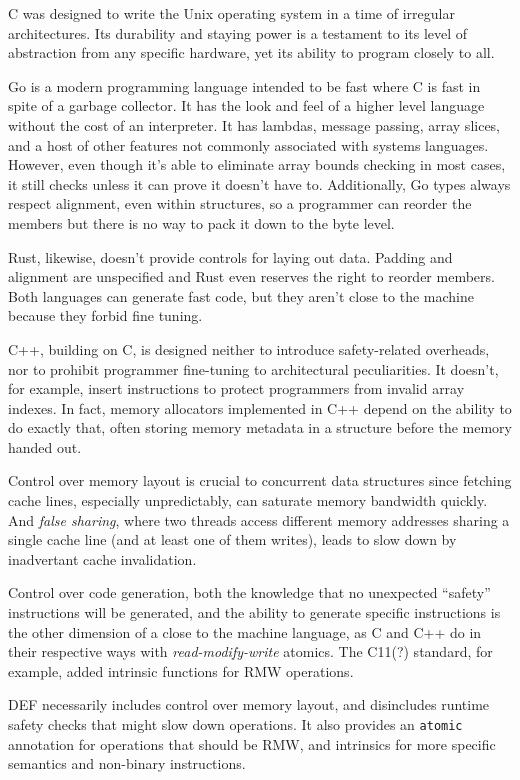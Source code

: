 C was designed to write the Unix operating system in a time of irregular architectures.  Its durability and staying power is a testament to its level of abstraction from any specific hardware, yet its ability to program closely to all.

Go is a modern programming language intended to be fast where C is fast in spite of a garbage collector.\cite{Go}  It has the look and feel of a higher level language without the cost of an interpreter.  It has lambdas, message passing, array slices, and a host of other features not commonly associated with systems languages.  However, even though it's able to eliminate array bounds checking in most cases, it still checks unless it can prove it doesn't have to.  Additionally, Go types always respect alignment, even within structures, so a programmer can reorder the members but there is no way to pack it down to the byte level.

Rust, likewise, doesn't provide controls for laying out data.  Padding and alignment are unspecified and Rust even reserves the right to reorder members.  Both languages can generate fast code, but they aren't close to the machine because they forbid fine tuning.

C++, building on C, is designed neither to introduce safety-related overheads, nor to prohibit programmer fine-tuning to architectural peculiarities.  It doesn't, for example, insert instructions to protect programmers from invalid array indexes.  In fact, memory allocators implemented in C++ depend on the ability to do exactly that, often storing memory metadata in a structure before the memory handed out.\cite{Hoard, TCMalloc, Supermalloc}

Control over memory layout is crucial to concurrent data structures since fetching cache lines, especially unpredictably, can saturate memory bandwidth quickly.  And \textit{false sharing}, where two threads access different memory addresses sharing a single cache line (and at least one of them writes), leads to slow down by inadvertant cache invalidation.

Control over code generation, both the knowledge that no unexpected ``safety'' instructions will be generated, and the ability to generate specific instructions is the other dimension of a close to the machine language, as C and C++ do in their respective ways with \textit{read-modify-write} atomics.  The C11(?) standard, for example, added intrinsic functions for RMW operations.

DEF necessarily includes control over memory layout, and disincludes runtime safety checks that might slow down operations.  It also provides an \texttt{atomic} annotation for operations that should be RMW, and intrinsics for more specific semantics and non-binary instructions.
